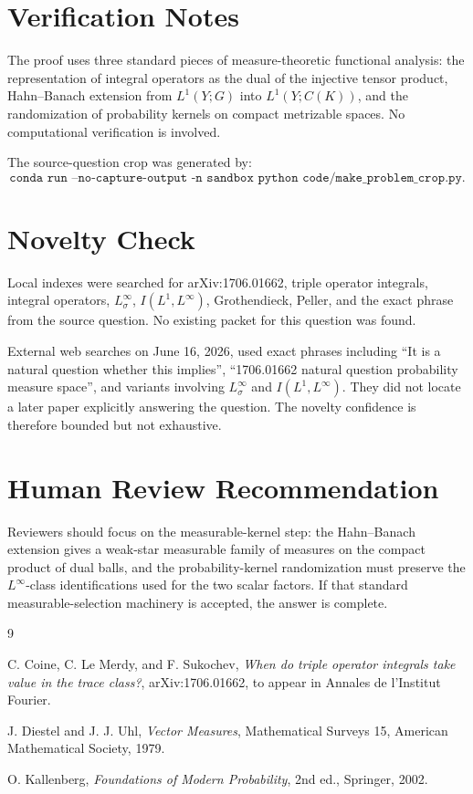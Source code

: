 \documentclass[11pt]{article}
\begin{document}
\section*{Verification Notes}

The proof uses three standard pieces of measure-theoretic functional analysis:
the representation of integral operators as the dual of the injective tensor
product, Hahn--Banach extension from \(L^1(Y;G)\) into \(L^1(Y;C(K))\), and the
randomization of probability kernels on compact metrizable spaces.  No
computational verification is involved.

The source-question crop was generated by:
\[
\texttt{conda run --no-capture-output -n sandbox python code/make\_problem\_crop.py}.
\]

\section*{Novelty Check}

Local indexes were searched for arXiv:1706.01662, triple operator integrals,
integral operators, \(L^\infty_\sigma\), \(I(L^1,L^\infty)\), Grothendieck,
Peller, and the exact phrase from the source question.  No existing packet for
this question was found.

External web searches on June 16, 2026, used exact phrases including
``It is a natural question whether this implies'', ``1706.01662 natural
question probability measure space'', and variants involving
\(L^\infty_\sigma\) and \(I(L^1,L^\infty)\).  They did not locate a later paper
explicitly answering the question.  The novelty confidence is therefore
bounded but not exhaustive.

\section*{Human Review Recommendation}

Reviewers should focus on the measurable-kernel step: the Hahn--Banach
extension gives a weak-star measurable family of measures on the compact
product of dual balls, and the probability-kernel randomization must preserve
the \(L^\infty\)-class identifications used for the two scalar factors.  If
that standard measurable-selection machinery is accepted, the answer is
complete.

\begin{thebibliography}{9}

C. Coine, C. Le Merdy, and F. Sukochev,
\emph{When do triple operator integrals take value in the trace class?},
arXiv:1706.01662, to appear in Annales de l'Institut Fourier.

J. Diestel and J. J. Uhl,
\emph{Vector Measures},
Mathematical Surveys 15, American Mathematical Society, 1979.

O. Kallenberg,
\emph{Foundations of Modern Probability},
2nd ed., Springer, 2002.

\end{thebibliography}
\end{document}

